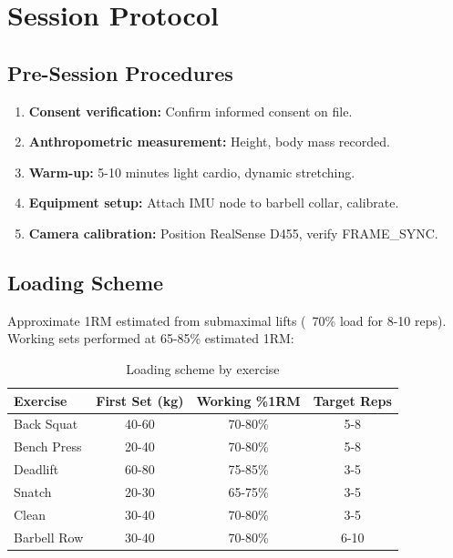 \section{Session Protocol}

\subsection{Pre-Session Procedures}

\begin{enumerate}
    \item \textbf{Consent verification:} Confirm informed consent on file.
    \item \textbf{Anthropometric measurement:} Height, body mass recorded.
    \item \textbf{Warm-up:} 5-10 minutes light cardio, dynamic stretching.
    \item \textbf{Equipment setup:} Attach IMU node to barbell collar, calibrate.
    \item \textbf{Camera calibration:} Position RealSense D455, verify FRAME\_SYNC.
\end{enumerate}

\subsection{Loading Scheme}

Approximate 1RM estimated from submaximal lifts (~70\% load for 8-10 reps). Working sets performed at 65-85\% estimated 1RM:

\begin{table}[h]
    \centering
    \caption{Loading scheme by exercise}
    \label{tab:loading}
    \begin{tabular}{lccc}
        \toprule
        \textbf{Exercise} & \textbf{First Set (kg)} & \textbf{Working \%1RM} & \textbf{Target Reps} \\
        \midrule
        Back Squat & 40-60 & 70-80\% & 5-8 \\
        Bench Press & 20-40 & 70-80\% & 5-8 \\
        Deadlift & 60-80 & 75-85\% & 3-5 \\
        Snatch & 20-30 & 65-75\% & 3-5 \\
        Clean & 30-40 & 70-80\% & 3-5 \\
        Barbell Row & 30-40 & 70-80\% & 6-10 \\
        \bottomrule
    \end{tabular}
\end{table}

